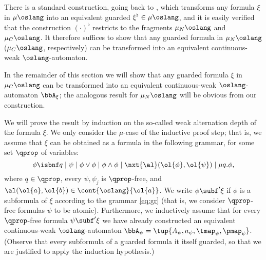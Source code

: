 There is a standard construction, going back to \cite{Koz83}, which transforms
any formula $\xi$ in $\mu\oslang$ into an equivalent guarded $\xi^\flat \in 
\mu\oslang$, and it is easily verified that the construction $(\cdot)^{\flat}$
restricts to the fragments $\mu_{N}\oslang$ and $\mu_{C}\oslang$.
It therefore suffices to show that any guarded formula in $\mu_{N}\oslang$
($\mu_{C}\oslang$, respectively) can be transformed into an equivalent
continuous-weak $\oslang$-automaton.

In the remainder of this section we will show that any guarded formula $\xi$ 
in $\mu_{C}\oslang$ can be transformed into an equivalent continuous-weak 
$\oslang$-automaton $\bbA_{\xi}$; the analogous result for $\mu_{N}\oslang$ will
be obvious from our construction.

We will prove the result by induction on the so-called weak alternation depth
of the formula $\xi$.
We only consider the $\mu$-case of the inductive proof step; that is, we 
assume that $\xi$ can be obtained as a formula in the following grammar, for 
some set $\qprop$ of variables:
\begin{equation}
\label{eq:gr}
\phi \isbnf 
   q \mid \psi \mid \phi\lor\phi \mid \phi\land\phi \mid
   \nxt{\al}(\ol{\phi},\ol{\psi}) \mid \mu q. \phi,
\end{equation}
where $q \in \qprop$, every $\psi,\psi_{j}$ is $\qprop$-free, and 
$\al(\ol{a},\ol{b}) \in \cont{\oslang}{\ol{a}}$.
We write $\phi \subf' \xi$ if $\phi$ is a subformula of $\xi$ according to 
the grammar \eqref{eq:gr} (that is, we consider $\qprop$-free formulas $\psi$
to be atomic).
Furthermore, we inductively assume that for every $\qprop$-free formula $\psi
\subf' \xi$ we have already constructed an equivalent continuous-weak 
$\oslang$-automaton $\bbA_{\psi} = \tup{A_{\psi},a_{\psi},\tmap_{\psi},
\pmap_{\psi}}$.
(Observe that every subformula of a guarded formula it itself guarded, so that 
we are justified to apply the induction hypothesis.)

